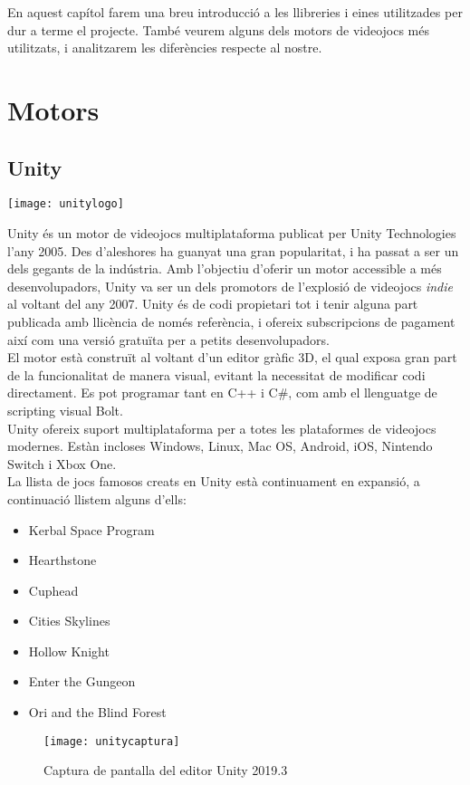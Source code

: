 En aquest capítol farem una breu introducció a les llibreries i eines utilitzades per dur a terme el projecte. També veurem alguns dels motors de videojocs més utilitzats, i analitzarem les diferències respecte al nostre.
\section{Motors}
\subsection{Unity}
\begin{center}
\texttt{[image: unitylogo]}
\end{center}
Unity és un motor de videojocs multiplataforma publicat per Unity Technologies l'any 2005. Des d'aleshores ha guanyat una gran popularitat, i ha passat a ser un dels gegants de la indústria.
Amb l'objectiu d'oferir un motor accessible a més desenvolupadors, Unity va ser un dels promotors de l'explosió de videojocs \textit{indie} al voltant del any 2007.
Unity és de codi propietari tot i tenir alguna part publicada amb llicència de només referència, i ofereix subscripcions de pagament així com una versió gratuïta per a petits desenvolupadors.
\\
El motor està construït al voltant d'un editor gràfic 3D, el qual exposa gran part de la funcionalitat de manera visual, evitant la necessitat de modificar codi directament.
Es pot programar tant en C++ i C#, com amb el llenguatge de scripting visual Bolt.
\\
Unity ofereix suport multiplataforma per a totes les plataformes de videojocs modernes. Estàn incloses Windows, Linux, Mac OS, Android, iOS, Nintendo Switch i Xbox One.
\\
La llista de jocs famosos creats en Unity està continuament en expansió, a continuació llistem alguns d'ells:
\begin{itemize}
  \item Kerbal Space Program
  \item Hearthstone
  \item Cuphead
  \item Cities Skylines
  \item Hollow Knight
  \item Enter the Gungeon
  \item Ori and the Blind Forest
\end{itemize}

\begin{figure}[h]
  \texttt{[image: unitycaptura]}
  \caption{Captura de pantalla del editor Unity 2019.3}
\end{figure}

